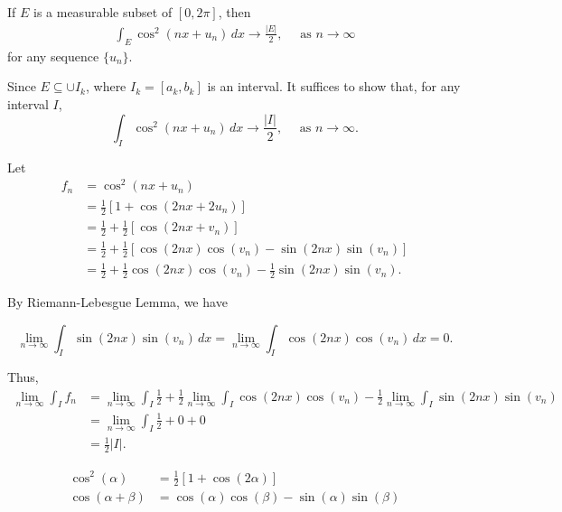 \documentclass[UTF8,a4paper,10pt]{article}
\begin{document}
\begin{Problem}[]{}
  If \(E\) is a measurable subset of \([0,2\pi]\), then
  \begin{align*}
    \int_{E} \cos^2(nx + u_{n}) \,dx\to\frac{|E|}{2},\quad \text{ as }n\to \infty
  \end{align*}
  for any sequence \(\{u_n\}\).
\end{Problem}

Since \(E\subseteq\cup I_k\), where \(I_k = [a_k, b_k]\) is an interval. It suffices to show that, for any interval \(I\), \[\int_{I} \cos^2(nx + u_{n}) \,dx\to\frac{|I|}{2},\quad \text{ as }n\to \infty.\]
  
Let 
\begin{align*}
  f_n &= \cos^2 (nx + u_{n})\\
  &=\frac{1}{2}\left[1 + \cos(2nx + 2u_{n})\right]\\
  &=\frac{1}{2} + \frac{1}{2}\left[\cos(2nx + v_{n})\right]\\
  &=\frac{1}{2} + \frac{1}{2}\left[\cos(2nx)\cos(v_{n})-\sin(2nx)\sin(v_{n})\right]\\
  &=\frac{1}{2} + \frac{1}{2}\cos(2nx)\cos(v_{n})-\frac{1}{2}\sin(2nx)\sin(v_{n}).
\end{align*}

By Riemann-Lebesgue Lemma, we have

\[\lim_{n\to\infty}\int_{I}\sin(2nx)\sin(v_{n}) \, dx = \lim_{n\to\infty}\int_{I}\cos(2nx)\cos(v_{n}) \, dx = 0.\]

Thus,
\begin{align*}
  \lim_{n\to \infty}\int_{I} f_n &=  \lim_{n\to \infty}\int_{I}\frac{1}{2} + \frac{1}{2} \lim_{n\to \infty}\int_{I}\cos(2nx)\cos(v_{n})-\frac{1}{2} \lim_{n\to \infty}\int_{I}\sin(2nx)\sin(v_{n})\\
  & = \lim_{n\to \infty}\int_{I}\frac{1}{2} + 0 + 0\\
  & = \frac{1}{2}|I|.
\end{align*}



\begin{mybox}{}
  \begin{align*}
    \cos^2(\alpha) &= \frac{1}{2}[1+\cos(2\alpha)]\\
    \cos(\alpha+\beta) &= \cos(\alpha)\cos(\beta)-\sin(\alpha)\sin(\beta)
  \end{align*}

\end{mybox}
\end{document}
